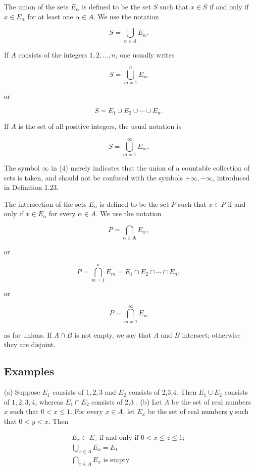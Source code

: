 \documentclass[10pt]{article}
\begin{document}
The union of the sets $E_{\alpha}$ is defined to be the set $S$ such that $x \in S$ if and only if $x \in E_{\alpha}$ for at least one $\alpha \in A$. We use the notation

$$
S=\bigcup_{\alpha \in A} E_{\alpha} .
$$

If $A$ consists of the integers $1,2, \ldots, n$, one usually writes

$$
S=\bigcup_{m=1}^{n} E_{m}
$$

or

$$
S=E_{1} \cup E_{2} \cup \cdots \cup E_{n} .
$$

If $A$ is the set of all positive integers, the usual notation is

$$
S=\bigcup_{m=1}^{\infty} E_{m} .
$$

The symbol $\infty$ in (4) merely indicates that the union of a countable collection of sets is taken, and should not be confused with the symbols $+\infty,-\infty$, introduced in Definition 1.23.

The intersection of the sets $E_{\alpha}$ is defined to be the set $P$ such that $x \in P$ if and only if $x \in E_{\alpha}$ for every $\alpha \in A$. We use the notation

$$
P=\bigcap_{\alpha \in \boldsymbol{A}} E_{\alpha},
$$

or

$$
P=\bigcap_{m=1}^{n} E_{m}=E_{1} \cap E_{2} \cap \cdots \cap E_{n},
$$

or

$$
P=\bigcap_{m=1}^{\infty} E_{m}
$$

as for unions. If $A \cap B$ is not empty, we say that $A$ and $B$ intersect; otherwise they are disjoint.

\subsection{Examples}
(a) Suppose $E_{1}$ consists of $1,2,3$ and $E_{2}$ consists of 2,3,4. Then $E_{1} \cup E_{2}$ consists of $1,2,3,4$, whereas $E_{1} \cap E_{2}$ consists of 2,3 .
(b) Let $A$ be the set of real numbers $x$ such that $0<x \leq 1$. For every $x \in A$, let $E_{x}$ be the set of real numbers $y$ such that $0<y<x$. Then

$$
\begin{gathered}
E_{x} \subset E_{z} \text { if and only if } 0<x \leq z \leq 1 ; \\
\bigcup_{x \in A} E_{x}=E_{1} \\
\bigcap_{x \in A} E_{x} \text { is empty }
\end{gathered}
$$
\end{document}
